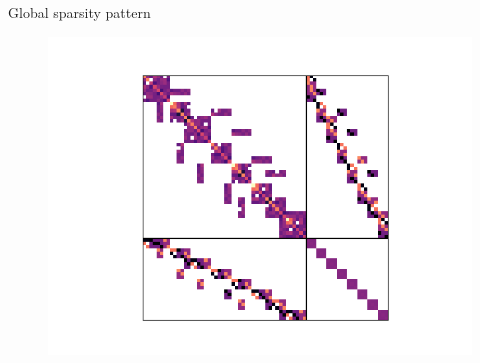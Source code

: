 \documentclass[9pt]{beamer}
\begin{document}
\begin{frame}[c]{Global sparsity pattern}
	\begin{figure}
		\centering
		\includegraphics[width=\textwidth]{figures/global_mixed_sparsity}
	\end{figure}
\end{frame}
\end{document}
